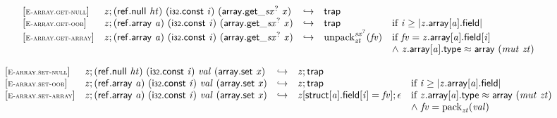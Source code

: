\vspace{1ex}

$$
\begin{array}{@{}l@{}lcl@{}l@{}}
{[\textsc{\scriptsize E{-}array.get{-}null}]} \quad & {\mathit{z}} ; (\mathsf{ref.null}~{\mathit{ht}})~(\mathsf{i{\scriptstyle32}}.\mathsf{const}~{\mathit{i}})~({{\mathsf{array.get}}{\mathsf{\_}}}{{{\mathit{sx}}^?}}~{\mathit{x}}) &\hookrightarrow& \mathsf{trap} &  \\
{[\textsc{\scriptsize E{-}array.get{-}oob}]} \quad & {\mathit{z}} ; (\mathsf{ref.array}~{\mathit{a}})~(\mathsf{i{\scriptstyle32}}.\mathsf{const}~{\mathit{i}})~({{\mathsf{array.get}}{\mathsf{\_}}}{{{\mathit{sx}}^?}}~{\mathit{x}}) &\hookrightarrow& \mathsf{trap} &\quad
  \mbox{if}~{\mathit{i}} \geq {|{\mathit{z}}.\mathsf{array}[{\mathit{a}}].\mathsf{field}|} \\
{[\textsc{\scriptsize E{-}array.get{-}array}]} \quad & {\mathit{z}} ; (\mathsf{ref.array}~{\mathit{a}})~(\mathsf{i{\scriptstyle32}}.\mathsf{const}~{\mathit{i}})~({{\mathsf{array.get}}{\mathsf{\_}}}{{{\mathit{sx}}^?}}~{\mathit{x}}) &\hookrightarrow& {{{{\mathrm{unpack}}}_{{\mathit{zt}}}^{{{\mathit{sx}}^?}}}}{({\mathit{fv}})} &\quad
  \mbox{if}~{\mathit{fv}} = {\mathit{z}}.\mathsf{array}[{\mathit{a}}].\mathsf{field}[{\mathit{i}}] \\
 &&&&\quad {\land}~{\mathit{z}}.\mathsf{array}[{\mathit{a}}].\mathsf{type} \approx \mathsf{array}~({\mathit{mut}}~{\mathit{zt}}) \\
\end{array}
$$

\vspace{1ex}

$$
\begin{array}{@{}l@{}lcl@{}l@{}}
{[\textsc{\scriptsize E{-}array.set{-}null}]} \quad & {\mathit{z}} ; (\mathsf{ref.null}~{\mathit{ht}})~(\mathsf{i{\scriptstyle32}}.\mathsf{const}~{\mathit{i}})~{\mathit{val}}~(\mathsf{array.set}~{\mathit{x}}) &\hookrightarrow& {\mathit{z}} ; \mathsf{trap} &  \\
{[\textsc{\scriptsize E{-}array.set{-}oob}]} \quad & {\mathit{z}} ; (\mathsf{ref.array}~{\mathit{a}})~(\mathsf{i{\scriptstyle32}}.\mathsf{const}~{\mathit{i}})~{\mathit{val}}~(\mathsf{array.set}~{\mathit{x}}) &\hookrightarrow& {\mathit{z}} ; \mathsf{trap} &\quad
  \mbox{if}~{\mathit{i}} \geq {|{\mathit{z}}.\mathsf{array}[{\mathit{a}}].\mathsf{field}|} \\
{[\textsc{\scriptsize E{-}array.set{-}array}]} \quad & {\mathit{z}} ; (\mathsf{ref.array}~{\mathit{a}})~(\mathsf{i{\scriptstyle32}}.\mathsf{const}~{\mathit{i}})~{\mathit{val}}~(\mathsf{array.set}~{\mathit{x}}) &\hookrightarrow& {\mathit{z}}[\mathsf{struct}[{\mathit{a}}].\mathsf{field}[{\mathit{i}}] = {\mathit{fv}}] ; \epsilon &\quad
  \mbox{if}~{\mathit{z}}.\mathsf{array}[{\mathit{a}}].\mathsf{type} \approx \mathsf{array}~({\mathit{mut}}~{\mathit{zt}}) \\
 &&&&\quad {\land}~{\mathit{fv}} = {{\mathrm{pack}}}_{{\mathit{zt}}}({\mathit{val}}) \\
\end{array}
$$

